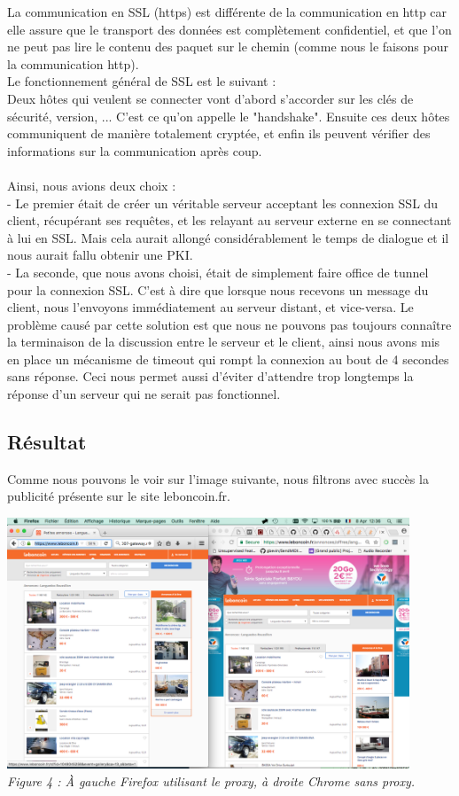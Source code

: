 \documentclass{scrreprt}
\begin{document}
La communication en SSL (https) est différente de la communication en http car elle assure que le transport des données est complètement confidentiel, et que l'on ne peut pas lire le contenu des paquet sur le chemin (comme nous le faisons pour la communication http).\\ Le fonctionnement général de SSL est le suivant : \\
Deux hôtes qui veulent se connecter vont d'abord s'accorder sur les clés de sécurité, version, ... C'est ce qu'on appelle le "handshake". Ensuite ces deux hôtes communiquent de manière totalement cryptée, et enfin ils peuvent vérifier des informations sur la communication après coup.\\
\\
Ainsi, nous avions deux choix :\\
- Le premier était de créer un véritable serveur acceptant les connexion SSL du client, récupérant ses requêtes, et les relayant au serveur externe en se connectant à lui en SSL. Mais cela aurait allongé considérablement le temps de dialogue et il nous aurait fallu obtenir une PKI.\\
- La seconde, que nous avons choisi, était de simplement faire office de tunnel pour la connexion SSL. C'est à dire que lorsque nous recevons un message du client, nous l'envoyons immédiatement au serveur distant, et vice-versa. Le problème causé par cette solution est que nous ne pouvons pas toujours connaître la terminaison de la discussion entre le serveur et le client, ainsi nous avons mis en place un mécanisme de timeout qui rompt la connexion au bout de 4 secondes sans réponse. Ceci nous permet aussi d'éviter d'attendre trop longtemps la réponse d'un serveur qui ne serait pas fonctionnel.

\subsection{Résultat}

Comme nous pouvons le voir sur l'image suivante, nous filtrons avec succès la publicité présente sur le site leboncoin.fr.
\\
\begin{center}
  \includegraphics[height=7.5cm]{images/f4.png}
  \\
  \textit{Figure 4 : À gauche Firefox utilisant le proxy, à droite Chrome sans proxy.}
\end{center}
\end{document}
